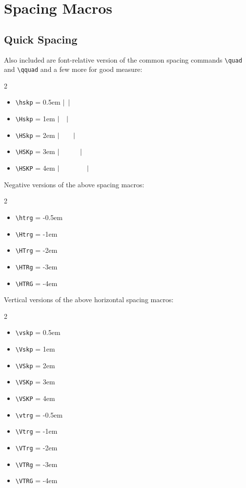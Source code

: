 \documentclass{article}
\begin{document}
\section{Spacing Macros}

\subsection*{Quick Spacing}

Also included are font-relative version of the common spacing commands \verb|\quad| and \verb|\qquad| and a few more for good measure:
    \vtrg\begin{multicols}{2}
    \begin{itemize}
        \item\verb|\hskp|  = 0.5em \hspace{5pt}$\vert\hskip.5em\relax\vert$
        \item\verb|\Hskp|  = 1em   \hspace{13pt}$\vert\hskip1em\relax\vert$
        \item\verb|\HSkp|  = 2em   \hspace{13pt}$\vert\hskip2em\relax\vert$
        \item\verb|\HSKp|  = 3em   \hspace{5pt}$\vert\hskip3em\relax\vert$
        \item\verb|\HSKP|  = 4em   \hspace{5pt}$\vert\hskip4em\relax\vert$
    \end{itemize}
    \end{multicols}\Vtrg\vtrg
    
Negative versions of the above spacing macros:
	\vtrg\begin{multicols}{2}
	\begin{itemize}
		\item\verb|\htrg|  = -0.5em
		\item\verb|\Htrg|  = -1em
		\item\verb|\HTrg|  = -2em
		\item\verb|\HTRg|  = -3em
		\item\verb|\HTRG|  = -4em
	\end{itemize}
	\end{multicols}\Vtrg\vtrg
   
Vertical versions of the above horizontal spacing macros:
    \vtrg\begin{multicols}{2}
	\begin{itemize}
		\item\verb|\vskp| = 0.5em 
		\item\verb|\Vskp| = 1em 
		\item\verb|\VSkp| = 2em 
		\item\verb|\VSKp| = 3em 
		\item\verb|\VSKP| = 4em 
		
		\item\verb|\vtrg| = -0.5em 
		\item\verb|\Vtrg| = -1em 
		\item\verb|\VTrg| = -2em 
		\item\verb|\VTRg| = -3em 
		\item\verb|\VTRG| = -4em 
	\end{itemize}
	\end{multicols}\Vtrg\vtrg
\end{document}
